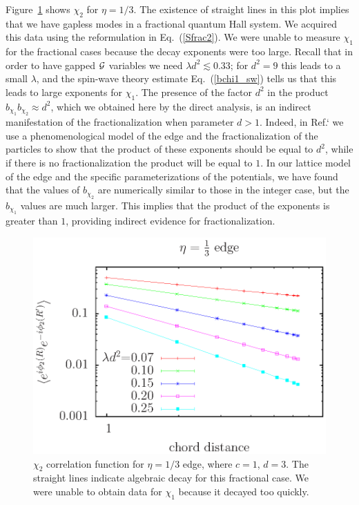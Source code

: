 Figure~\ref{onethird} shows $\chi_2$ for $\eta=1/3$. The existence of straight lines in this plot implies that we have gapless modes in a fractional quantum Hall system. We acquired this data using the reformulation in Eq.~(\ref{Sfrac2}). We were unable to measure $\chi_1$ for the fractional cases because the decay exponents were too large. Recall that in order to have gapped $\cal{G}$ variables we need $\lambda d^2 \lesssim 0.33$; for $d^2=9$ this leads to a small $\lambda$, and the spin-wave theory estimate Eq.~(\ref{bchi1_sw}) tells us that this leads to large exponents for $\chi_1$.  The presence of the factor $d^2$ in the product $b_{\chi_1} b_{\chi_2} \approx d^2$, which we obtained here by the direct analysis, is an indirect manifestation of the fractionalization when parameter $d>1$.  
Indeed, 
in Ref.`\cite{FQHE} we use a phenomenological model of the edge and the fractionalization of the particles to show that the product of these exponents should be equal to $d^2$, while if there is no fractionalization the product will be equal to $1$. In our lattice model of the edge and the specific parameterizations of the potentials, we have found that the values of $b_{\chi_2}$ are numerically similar to those in the integer case, but the $b_{\chi_1}$ values are much larger. This implies that the product of the exponents is greater than $1$, providing indirect evidence for fractionalization.

\begin{figure}
\includegraphics[width=\linewidth]{figures/thirdcord.eps}
\caption{ $\chi_2$ correlation function for $\eta=1/3$ edge, where $c=1$, $d=3$. The straight lines indicate algebraic decay for this fractional case. We were unable to obtain data for $\chi_1$ because it decayed too quickly.
\label{onethird}}
\end{figure}


